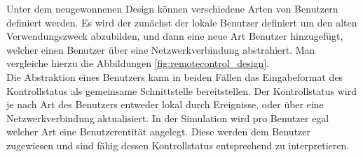 Unter dem neugewonnenen Design können verschiedene Arten von Benutzern definiert werden. Es wird der zunächst der lokale Benutzer definiert um den alten Verwendungszweck abzubilden, und dann eine neue Art Benutzer hinzugefügt, welcher einen Benutzer über eine Netzwerkverbindung abstrahiert. Man vergleiche hierzu die Abbildungen \ref{fig:remotecontrol_design}.\\
Die Abstraktion eines Benutzers kann in beiden Fällen das Eingabeformat des Kontrollstatus als gemeinsame Schnittstelle bereitstellen. Der Kontrollstatus wird je nach Art des Benutzers entweder lokal durch Ereignisse, oder über eine Netzwerkverbindung aktualisiert. 
In der Simulation wird pro Benutzer egal welcher Art eine Benutzerentität angelegt.
Diese werden dem Benutzer zugewiesen und sind fähig dessen Kontrollstatus entsprechend zu interpretieren.
